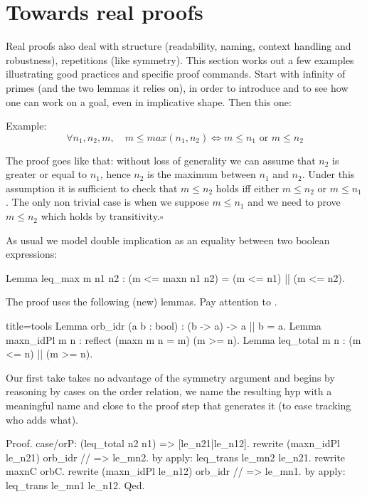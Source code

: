 \section{Towards real proofs}

Real proofs also deal with structure (readability, naming, context handling and
robustness), repetitions (like symmetry).  This section works out a few
examples illustrating good practices and specific proof
commands. Start with infinity of primes (and the two lemmas it relies
on), in order to introduce  and to see how one can work on a
goal, even in implicative shape. Then this one:

Example:
$$
\forall n_1, n_2, m, \quad m \le max(n_1,n_2)
\Leftrightarrow m \le n_1 \textrm{ or } m \le n_2
$$

The proof goes like that: without loss of generality we can assume that
$n_2$ is greater or equal to $n_1$, hence $n_2$ is the maximum between
$n_1$ and $n_2$.  Under this assumption it is sufficient to check
that $m \le n_2$ holds iff either $m \le n_2$ or $m \le n_1$.
The only non trivial case is when we suppose $m \le n_1$ and
we need to prove $m \le n_2$ which holds by transitivity.\hfill$\square$

As usual we model double implication as an equality between two
boolean expressions:

\begin{coq}{}{}
Lemma leq_max m n1 n2 : (m <= maxn n1 n2) = (m <= n1) || (m <= n2).
\end{coq}

The proof uses the following (new) lemmas.  Pay attention to
.

\begin{coq}{}{title=tools}
Lemma orb_idr (a b : bool) : (b -> a) -> a || b = a.
Lemma maxn_idPl {m n} : reflect (maxn m n = m) (m >= n).
Lemma leq_total m n : (m <= n) || (m >= n).
\end{coq}

Our first take takes no advantage of the symmetry argument and
begins by reasoning by cases on the order relation,
we name the resulting hyp with a meaningful name and close to
the proof step that generates it (to ease tracking who adds what).

\begin{coq}{}{}
Proof.
case/orP: (leq_total n2 n1) => [le_n21|le_n12].
  rewrite (maxn_idPl le_n21) orb_idr // => le_mn2.
  by apply: leq_trans le_mn2 le_n21.
rewrite maxnC orbC.
rewrite (maxn_idPl le_n12) orb_idr // => le_mn1.
by apply: leq_trans le_mn1 le_n12.
Qed.
\end{coq}


